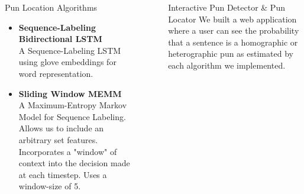 \documentclass[final]{beamer}
\newlength{\sepwid}
\newlength{\onecolwid}
\newlength{\twocolwid}
\begin{document}
\begin{frame}[t]
\begin{columns}[t]
\begin{column}{\twocolwid}
\begin{columns}[t,totalwidth=\twocolwid]
\begin{column}{\onecolwid}
\begin{block}{Pun Location Algorithms}
{\begin{itemize}
{									Our baseline---an easy to implement algorithm which we measured approaches against
								}
								\item {\textbf{Sequence-Labeling Bidirectional LSTM}\\
									A Sequence-Labeling LSTM using glove embeddings for word representation.
								}
								\item {\textbf{Sliding Window MEMM}\\
									A Maximum-Entropy Markov Model for Sequence Labeling. Allows us to include an arbitrary set features. Incorporates a "window" of context into the decision made at each timestep. Uses a window-size of 5. 
								}
							\end{itemize}
							\\
						}
					\end{block}
				\end{column}
				\begin{column}{\sepwid}\end{column} %
			\end{columns}
		\end{column}
		\begin{column}{\sepwid}\end{column} %
		\begin{column}{\onecolwid}
            
			\begin{block}{Interactive Pun Detector \& Pun Locator}
				\large{
					We built a web application where a user can see the probability that a sentence is a homographic or heterographic pun as estimated by each algorithm we implemented.
				}


\end{block}
\end{column}
\end{columns}
\end{frame}
\end{document}
